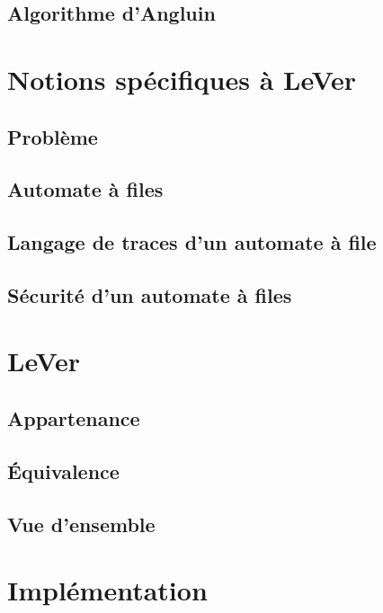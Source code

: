 	\section{Algorithme d'Angluin}\label{sec:angluin}

	\chapter{Notions spécifiques à LeVer}\label{ch:specific}
	\section{Problème}\label{sec:prob}%
	\section{Automate à files}\label{sec:fifo}
	\section{Langage de traces d'un automate à file}\label{sec:trace}%
	\section{Sécurité d'un automate à files}\label{sec:unsafe}%

	\chapter{LeVer}\label{ch:lever}
	\section{Appartenance}\label{sec:membership}
	\section{Équivalence}\label{sec:equivalence}
	\section{Vue d'ensemble}\label{sec:global}


	\chapter{Implémentation}\label{ch:impl}
